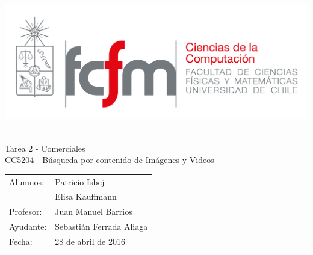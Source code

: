 \documentclass[14pt,letterpaper,hidelinks]{extarticle}
\begin{document}
\thispagestyle{empty}
\renewcommand*\listtablename{Índice de tablas}
\renewcommand{\contentsname}{\'Indice}
\renewcommand*{\refname}{}

\newpage
\pagestyle{fancy}
\fancyhf{}
\hbox{\includegraphics[scale=0.3]{img/fcfm_dcc_png.png} }
\vspace*{4cm}
\begin{center}
\Huge  {Tarea 2 - Comerciales}\\
\vspace{1cm}
\Large {CC5204 - Búsqueda por contenido de Imágenes y Videos}\\


\vspace{1cm}
\end{center}
\begin{flushright}
\begin{table}[h]
	\large
	\centering
	\begin{tabular}{ll}
		Alumnos: & Patricio Isbej\\
				& Elisa Kauffmann\\
		Profesor: & Juan Manuel Barrios\\
		Ayudante: & Sebastián Ferrada Aliaga\\
		Fecha: & 28 de abril de 2016
	\end{tabular}
\end{table}
\end{flushright}

\newpage
\pagestyle{fancy}
\fancyhf{}

\fancyhead[R]{\small \rm \textbf{\thepage}} %
\end{document}
